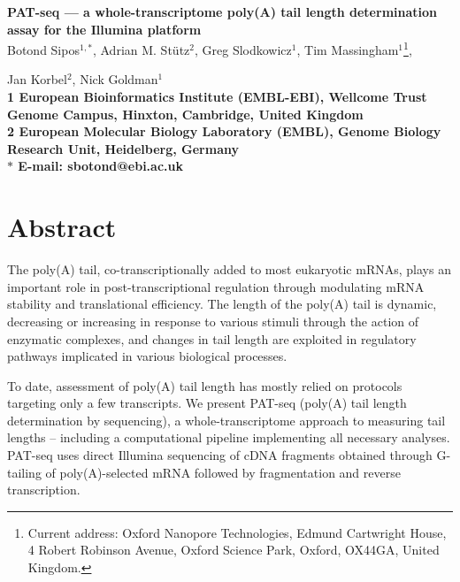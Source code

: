 \documentclass[10pt]{article}
\date{}
\begin{document}
\begin{flushleft}
{\Large
\textbf{PAT-seq --- a whole-transcriptome poly(A) tail length determination assay for the Illumina platform}
}
\\
Botond Sipos$^{1, \ast}$, 
Adrian M. St\"utz$^{2}$, 
Greg Slodkowicz$^{1}$,
Tim Massingham$^{1}$\footnote{Current address: Oxford Nanopore Technologies, Edmund Cartwright House, 4 Robert Robinson Avenue, Oxford Science Park, Oxford, OX44GA, United Kingdom.},

Jan Korbel$^{2}$, 
Nick Goldman$^{1}$
\\
\bf{1} European Bioinformatics Institute (EMBL-EBI), Wellcome Trust Genome Campus, Hinxton, Cambridge, United Kingdom
\\
\bf{2} European Molecular Biology Laboratory (EMBL), Genome Biology Research Unit, Heidelberg, Germany 
\\
$\ast$ E-mail: sbotond@ebi.ac.uk
\end{flushleft}


\section*{Abstract}

The poly(A) tail, co-transcriptionally added to most eukaryotic mRNAs, plays an important role in post-transcriptional regulation through modulating mRNA stability and translational efficiency. The length of the poly(A) tail is dynamic, decreasing or increasing in response to various stimuli through the action of enzymatic complexes, and changes in tail length are exploited in regulatory pathways implicated in various biological processes.

To date, assessment of poly(A) tail length has mostly relied on protocols targeting only a few transcripts. We present PAT-seq (poly(A) tail length determination by sequencing), a whole-transcriptome approach to measuring tail lengths  -- including a computational pipeline implementing all necessary analyses. PAT-seq uses direct Illumina sequencing of cDNA fragments obtained through G-tailing of poly(A)-selected mRNA followed by fragmentation and reverse transcription. 
\end{document}
